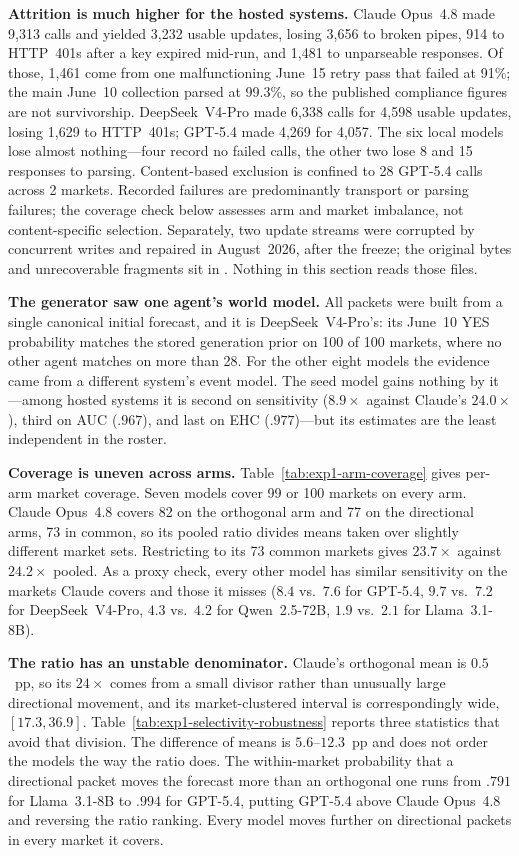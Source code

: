 \textbf{Attrition is much higher for the hosted systems.} Claude Opus~4.8 made
9{,}313 calls and yielded 3{,}232 usable updates, losing 3{,}656 to broken pipes,
914 to HTTP~401s after a key expired mid-run, and 1{,}481 to unparseable
responses. Of those, 1{,}461 come from one malfunctioning June~15 retry pass that
failed at 91\%; the main June~10 collection parsed at 99.3\%, so the published
compliance figures are not survivorship. DeepSeek~V4-Pro made 6{,}338 calls for
4{,}598 usable updates, losing 1{,}629 to HTTP~401s; GPT-5.4 made 4{,}269 for
4{,}057. The six local models lose almost nothing---four record no failed calls,
the other two lose 8 and 15 responses to parsing. Content-based exclusion is
confined to 28 GPT-5.4 calls across 2 markets. Recorded failures are predominantly
transport or parsing failures; the coverage check below assesses arm and market
imbalance, not content-specific selection. Separately, two
update streams were corrupted by concurrent writes and repaired in August~2026,
after the freeze; the original bytes and unrecoverable fragments sit in
. Nothing in this section reads those
files.

\textbf{The generator saw one agent's world model.} All packets were built from a
single canonical initial forecast, and it is DeepSeek~V4-Pro's: its June~10 YES
probability matches the stored generation prior on 100 of 100 markets, where no
other agent matches on more than 28. For the other eight models the evidence came
from a different system's event model. The seed model gains nothing by it---among
hosted systems it is second on sensitivity ($8.9\times$ against Claude's
$24.0\times$), third on AUC ($.967$), and last on EHC ($.977$)---but its estimates
are the least independent in the roster.

\textbf{Coverage is uneven across arms.} Table~\ref{tab:exp1-arm-coverage} gives
per-arm market coverage. Seven models cover 99 or 100 markets on every arm. Claude
Opus~4.8 covers 82 on the orthogonal arm and 77 on the directional arms, 73 in
common, so its pooled ratio divides means taken over slightly different market
sets. Restricting to its 73 common markets gives $23.7\times$ against $24.2\times$
pooled. As a proxy check, every other model has similar sensitivity on the markets
Claude covers and those it misses ($8.4$ vs.\
$7.6$ for GPT-5.4, $9.7$ vs.\ $7.2$ for DeepSeek~V4-Pro, $4.3$ vs.\ $4.2$ for
Qwen~2.5-72B, $1.9$ vs.\ $2.1$ for Llama~3.1-8B).

\textbf{The ratio has an unstable denominator.} Claude's orthogonal mean is
$0.5$~pp, so its $24\times$ comes from a small divisor rather than unusually large
directional movement, and its market-clustered interval is correspondingly wide,
$[17.3,36.9]$. Table~\ref{tab:exp1-selectivity-robustness} reports three
statistics that avoid that division. The difference of means is $5.6$--$12.3$~pp
and does not order the models the way the ratio does. The within-market
probability that a directional packet moves the forecast more than an orthogonal
one runs from $.791$ for Llama~3.1-8B to $.994$ for GPT-5.4, putting GPT-5.4 above
Claude Opus~4.8 and reversing the ratio ranking. Every model moves further on
directional packets in every market it covers.

